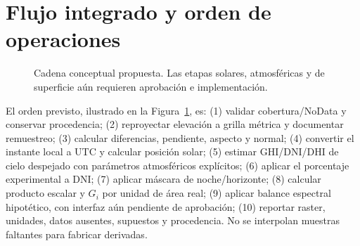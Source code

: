 \documentclass[11pt,a4paper]{article}
\begin{document}
\section{Flujo integrado y orden de operaciones}
\begin{figure}[ht]
\centering
{}
\caption{Cadena conceptual propuesta. Las etapas solares, atmosféricas y de superficie aún requieren aprobación e implementación.}\label{fig:workflow}
\end{figure}

El orden previsto, ilustrado en la Figura~\ref{fig:workflow}, es: (1) validar cobertura/NoData y conservar procedencia; (2) reproyectar elevación a grilla métrica y documentar remuestreo; (3) calcular diferencias, pendiente, aspecto y normal; (4) convertir el instante local a UTC y calcular posición solar; (5) estimar GHI/DNI/DHI de cielo despejado con parámetros atmosféricos explícitos; (6) aplicar el porcentaje experimental a DNI; (7) aplicar máscara de noche/horizonte; (8) calcular producto escalar y $G_i$ por unidad de área real; (9) aplicar balance espectral hipotético, con interfaz aún pendiente de aprobación; (10) reportar raster, unidades, datos ausentes, supuestos y procedencia. No se interpolan muestras faltantes para fabricar derivadas.
\end{document}
